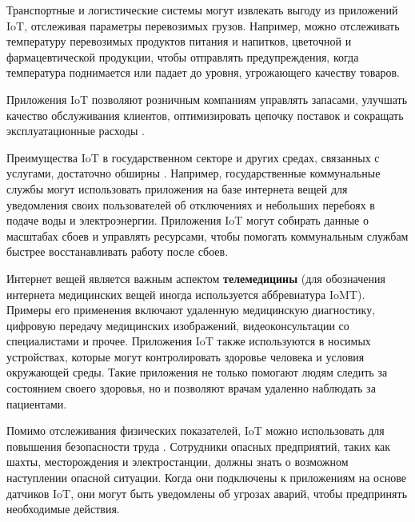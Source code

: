 
Транспортные и логистические системы могут извлекать выгоду из приложений IoT, отслеживая параметры перевозимых грузов. Например, можно отслеживать температуру перевозимых продуктов питания и напитков, цветочной и фармацевтической продукции, чтобы отправлять предупреждения, когда температура поднимается или падает до уровня, угрожающего качеству товаров.


Приложения IoT позволяют розничным компаниям управлять запасами, улучшать качество обслуживания клиентов, оптимизировать цепочку поставок и сокращать эксплуатационные расходы \cite{Oracle}.


Преимущества IoT в государственном секторе и других средах, связанных с услугами, достаточно обширны \cite{Oracle}. Например, государственные коммунальные службы могут использовать приложения на базе интернета вещей для уведомления своих пользователей об отключениях и небольших перебоях в подаче воды и электроэнергии. Приложения IoT могут собирать данные о масштабах сбоев и управлять ресурсами, чтобы помогать коммунальным службам быстрее восстанавливать работу после сбоев.


Интернет вещей является важным аспектом \textbf{телемедицины} \cite{Kaspersky} (для обозначения интернета медицинских вещей иногда используется аббревиатура IoMT). Примеры его применения включают удаленную медицинскую диагностику, цифровую передачу медицинских изображений, видеоконсультации со специалистами и прочее. Приложения IoT также используются в носимых устройствах, которые могут контролировать здоровье человека и условия окружающей среды. Такие приложения не только помогают людям следить за состоянием своего здоровья, но и позволяют врачам удаленно наблюдать за пациентами.


Помимо отслеживания физических показателей, IoT можно использовать для повышения безопасности труда \cite{Oracle}. Сотрудники опасных предприятий, таких как шахты, месторождения и электростанции, должны знать о возможном наступлении опасной ситуации. Когда они подключены к приложениям на основе датчиков IoT, они могут быть уведомлены об угрозах аварий, чтобы предпринять необходимые действия.



